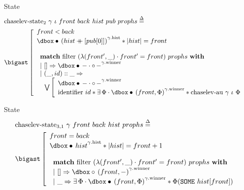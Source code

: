 \begin{frame}{State}
\small
\begin{align*}
		&\mathrm{chaselev \mathhyphen state_2}\ \gamma\ \iota\ front\ back\ hist\ pub\ prophs
		\eqdef
	\\
		&\iBigsep\left[\begin{array}{l}
				front < back
			\\
				\iGhost{\gamma\mathrm{.hist}}{\iAuth{(hist \mdoubleplus [pub [0]])}} \iSep
				| hist | = front
			\\\\
				\begin{array}{l}
						\bold{match}\ \mathrm{filter}\ (\lambda (front', \_) \cdot front' = front)\ prophs\ \bold{with}
					\\
						|\ [] \Rightarrow
						\iGhost{\gamma\mathrm{.winner}}{\iAuth{-} \cdot \iFrag{-}}
					\\
						|\ (\_, id) :: \_ \Rightarrow
					\\
						\ \ 
						\bigvee\left[\begin{array}{l}
								\iGhost{\gamma\mathrm{.winner}}{\iAuth{-} \cdot \iFrag{-}}
							\\
								\mathrm{identifier}\ id \iSep
								\exists \Phi \cdot
								\iGhost{\gamma\mathrm{.winner}}{\iAuth{(front, \Phi)}} \iSep
								\mathrm{chaselev \mathhyphen au}\ \gamma\ \iota\ \Phi
						\end{array}\right.
				\end{array}
		\end{array}\right.
\end{align*}
\end{frame}


\begin{frame}{State}
\small
\begin{align*}
		&\mathrm{chaselev \mathhyphen state_{3,1}}\ \gamma\ front\ back\ hist\ prophs
		\eqdef
	\\
		&\iBigsep\left[\begin{array}{l}
				front = back
			\\
				\iGhost{\gamma\mathrm{.hist}}{\iAuth{hist}} \iSep
				| hist | = front + 1
			\\\\
				\begin{array}{l}
						\bold{match}\ \mathrm{filter}\ (\lambda (front', \_) \cdot front' = front)\ prophs\ \bold{with}
					\\
						|\ [] \Rightarrow
						\iGhost{\gamma\mathrm{.winner}}{\iFrag{(front, -)}}
					\\
						|\ \_ \Rightarrow
						\exists \Phi \cdot
						\iGhost{\gamma\mathrm{.winner}}{\iAuth{(front, \Phi)}} \iSep
						\Phi (\exprSome{hist [front]})
				\end{array}
		\end{array}\right.
\end{align*}
\end{frame}

